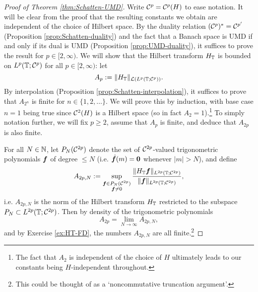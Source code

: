 \begin{proof}[Proof of Theorem \ref{thm:Schatten-UMD}]
  Write $\mathcal{C}^{p} = \mathcal{C}^{p}(H)$ to ease notation.
  It will be clear from the proof that the resulting constants we obtain are independent of the choice of Hilbert space.
  By the duality relation $(\mathcal{C}^{p})^* = \mathcal{C}^{p'}$ (Proposition \ref{prop:Schatten-duality}) and the fact that a Banach space is UMD if and only if its dual is UMD (Proposition \ref{prop:UMD-duality}), it suffices to prove the result for $p \in [2,\infty)$.
  We will show that the Hilbert transform $H_{\mathbb{T}}$ is bounded on $L^p(\mathbb{T};\mathcal{C}^{p})$ for all $p \in [2,\infty)$: let
  \begin{equation*}
    A_{p} := \|H_{\mathbb{T}}\|_{\mathcal{L}(L^p(\mathbb{T};\mathcal{C}^{p}))}.
  \end{equation*}
  By interpolation (Proposition \ref{prop:Schatten-interpolation}), it suffices to prove that $A_{2^{n}}$ is finite for $n \in \{1,2,\ldots\}$.
  We will prove this by induction, with base case $n=1$ being true since $\mathcal{C}^{2}(H)$ is a Hilbert space (so in fact $A_{2} = 1$).\footnote{The fact that $A_{2}$ is independent of the choice of $H$ ultimately leads to our constants being $H$-independent throughout.}
  To simply notation further, we will fix $p \geq 2$, assume that $A_{p}$ is finite, and deduce that $A_{2p}$ is also finite.


  For all $N \in \mathbb{N}$, let $P_{N}(\mathcal{C}^{2p})$ denote the set of $\mathcal{C}^{2p}$-valued trigonometric polynomials $\bm{f}$ of degree $\leq N$ (i.e. $\hat{\bm{f}}(m) = \bm{0}$ whenever $|m| > N$), and define
  \begin{equation*}
    A_{2p,N} := \sup_{\substack{\bm{f} \in P_{N}(\mathcal{C}^{2p}) \\ \bm{f} \neq 0}} \frac{\|H_{\mathbb{T}} \bm{f}\|_{L^{2p}(\mathbb{T};\mathcal{C}^{2p})}}{\|\bm{f}\|_{L^{2p}(\mathbb{T};\mathcal{C}^{2p})}},
  \end{equation*}
  i.e. $A_{2p,N}$ is the norm of the Hilbert transform $H_{\mathbb{T}}$ restricted to the subspace $P_{N} \subset L^{2p}(\mathbb{T};\mathcal{C}^{2p})$.
  Then by density of the trigonometric polynomials
  \begin{equation*}
    A_{2p} = \lim_{N \to \infty} A_{2p,N},
  \end{equation*}
  and by Exercise \ref{ex:HT-FD}, the numbers $A_{2p,N}$ are all finite.\footnote{This could be thought of as a `noncommutative truncation argument'.}


\end{proof}

